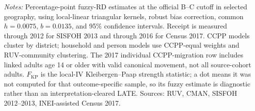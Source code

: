 \begin{minipage}{0.98\linewidth}\footnotesize\textit{Notes:} Percentage-point fuzzy-RD estimates at the official B--C cutoff in selected geography, using local-linear triangular kernels, robust bias correction, common \(h=0.0075\), \(b=0.0135\), and 95\% confidence intervals. Receipt is measured through 2012 for SISFOH 2013 and through 2016 for Census 2017. CCPP models cluster by district; household and person models use CCPP-equal weights and RUV-community clustering. The 2017 individual CCPP-migration row includes linked adults age 14 or older with valid canonical movement, not all source-cohort adults. \(F_{\mathrm{KP}}\) is the local-IV Kleibergen--Paap strength statistic; a dot means it was not computed for that outcome-specific sample, so its fuzzy estimate is diagnostic rather than an interpretation-cleared LATE. Sources: RUV, CMAN, SISFOH 2012--2013, INEI-assisted Census 2017.\end{minipage}
\endgroup
